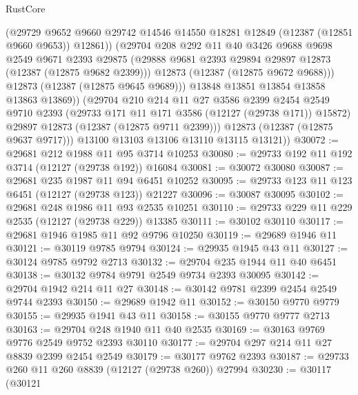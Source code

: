 \begin{lexlean}{RustCore}
\begin{coremodule}
                  (@29729
                    @9652
                    @9660
                    @29742
                    @14546
                    @14550
                    @18281
                    @12849
                    (@12387 (@12851 @9660 @9653))
                    @12861))
                (@29704
                  @208
                  @292
                  @11
                  @40
                  @3426
                  @9688
                  @9698
                  @2549
                  @9671
                  @2393
                  @29875
                  (@29888 @9681 @2393 @29894 @29897 @12873 (@12387 (@12875 @9682 @2399)))
                  @12873
                  (@12387 (@12875 @9672 @9688)))
                @12873
                (@12387 (@12875 @9645 @9689)))
              @13848
              @13851
              @13854
              @13858
              @13863
              @13869))
          (@29704
            @210
            @214
            @11
            @27
            @3586
            @2399
            @2454
            @2549
            @9710
            @2393
            (@29733 @171 @11 @171 @3586 (@12127 (@29738 @171)) @15872)
            @29897
            @12873
            (@12387 (@12875 @9711 @2399)))
          @12873
          (@12387 (@12875 @9637 @9717)))
        @13100
        @13103
        @13106
        @13110
        @13115
        @13121))
@30072 := @29681 @212 @1988 @11 @95 @3714 @10253
@30080 := @29733 @192 @11 @192 @3714 (@12127 (@29738 @192)) @16084
@30081 := @30072 @30080
@30087 := @29681 @235 @1987 @11 @94 @6451 @10252
@30095 := @29733 @123 @11 @123 @6451 (@12127 (@29738 @123)) @21227
@30096 := @30087 @30095
@30102 := @29681 @248 @1986 @11 @93 @2535 @10251
@30110 := @29733 @229 @11 @229 @2535 (@12127 (@29738 @229)) @13385
@30111 := @30102 @30110
@30117 := @29681 @1946 @1985 @11 @92 @9796 @10250
@30119 := @29689 @1946 @11
@30121 := @30119 @9785 @9794
@30124 := @29935 @1945 @43 @11
@30127 := @30124 @9785 @9792 @2713
@30132 := @29704 @235 @1944 @11 @40 @6451
@30138 := @30132 @9784 @9791 @2549 @9734 @2393 @30095
@30142 := @29704 @1942 @214 @11 @27
@30148 := @30142 @9781 @2399 @2454 @2549 @9744 @2393
@30150 := @29689 @1942 @11
@30152 := @30150 @9770 @9779
@30155 := @29935 @1941 @43 @11
@30158 := @30155 @9770 @9777 @2713
@30163 := @29704 @248 @1940 @11 @40 @2535
@30169 := @30163 @9769 @9776 @2549 @9752 @2393 @30110
@30177 := @29704 @297 @214 @11 @27 @8839 @2399 @2454 @2549
@30179 := @30177 @9762 @2393
@30187 := @29733 @260 @11 @260 @8839 (@12127 (@29738 @260)) @27994
@30230 := @30117
    (@30121

\end{coremodule}
\end{lexlean}
